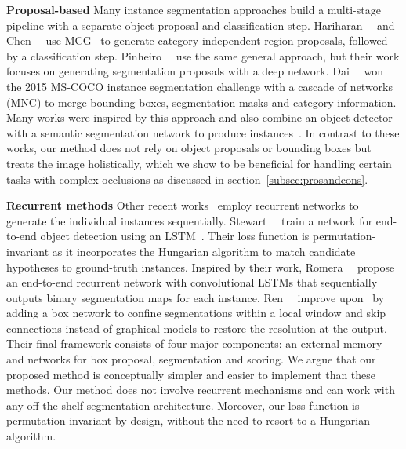 \documentclass[10pt,twocolumn,letterpaper]{article}
\begin{document}
\textbf{Proposal-based}
Many instance segmentation approaches build a multi-stage pipeline with a separate object proposal and classification step.
Hariharan~\etal~\cite{hariharan2014simultaneous} and Chen~\etal~\cite{chen2015multi} use MCG~\cite{arbelaez2014multiscale} to generate category-independent region proposals, followed by a classification step.
Pinheiro~\etal~\cite{pinheiro2015learning, pinheiro2016learning} use the same general approach, but their work focuses on generating segmentation proposals with a deep network.
Dai~\etal~\cite{dai2015convolutional, dai2015instance} won the 2015 MS-COCO instance segmentation challenge with a cascade of networks (MNC) to merge bounding boxes, segmentation masks and category information. Many works were inspired by this approach and also combine an object detector with a semantic segmentation network to produce instances~\cite{xu2016gland, arnab2016bottom, hayder2016shape}.
In contrast to these works, our method does not rely on object proposals or bounding boxes but treats the image holistically, which we show to be beneficial for handling certain tasks with complex occlusions as discussed in section~\ref{subsec:prosandcons}.


\textbf{Recurrent methods}
Other recent works~\cite{park2015learning, romera2015recurrent, ren2016end} employ recurrent networks to generate the individual instances sequentially.
Stewart~\etal~\cite{stewart2015end} train a network for end-to-end object detection using an LSTM~\cite{hochreiter1997long}. Their loss function is permutation-invariant as it incorporates the Hungarian algorithm to match candidate hypotheses to ground-truth instances.
Inspired by their work, Romera~\etal~\cite{romera2015recurrent} propose an end-to-end recurrent network with convolutional LSTMs that sequentially outputs binary segmentation maps for each instance. 
Ren~\etal~\cite{ren2016end} improve upon~\cite{romera2015recurrent} by adding a box network to confine segmentations within a local window and skip connections instead of graphical models to restore the resolution at the output. Their final framework consists of four major components: an external memory and networks for box proposal, segmentation and scoring. 
We argue that our proposed method is conceptually simpler and easier to implement than these methods. Our method does not involve recurrent mechanisms and can work with any off-the-shelf segmentation architecture. 
Moreover, our loss function is permutation-invariant by design, without the need to resort to a Hungarian algorithm.
\end{document}
